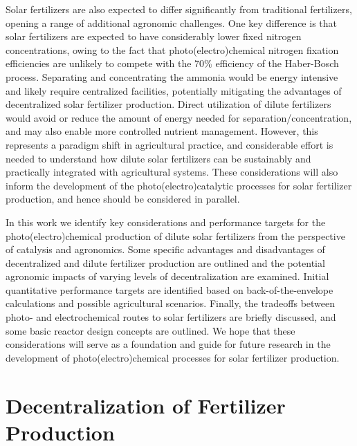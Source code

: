 Solar fertilizers are also expected to differ significantly from traditional fertilizers, opening a range of additional agronomic challenges. One key difference is that solar fertilizers are expected to have considerably lower fixed nitrogen concentrations, owing to the fact that photo(electro)chemical nitrogen fixation efficiencies are unlikely to compete with the 70\% efficiency of the Haber-Bosch process.\cite{Schloegl_2003} %
Separating and concentrating the ammonia would be energy intensive and likely require centralized facilities, potentially mitigating the advantages of decentralized solar fertilizer production. Direct utilization of dilute fertilizers would avoid or reduce the amount of energy needed for separation/concentration, and may also enable more controlled nutrient management. However, this represents a paradigm shift in agricultural practice, and considerable effort is needed to understand how dilute solar fertilizers can be sustainably and practically integrated with agricultural systems. These considerations will also inform the development of the photo(electro)catalytic processes for solar fertilizer production, and hence should be considered in parallel.

In this work we identify key considerations and performance targets for the photo(electro)chemical production of dilute solar fertilizers from the perspective of catalysis and agronomics. Some specific advantages and disadvantages of decentralized and dilute fertilizer production are outlined and the potential agronomic impacts of varying levels of decentralization are examined. Initial quantitative performance targets are identified based on back-of-the-envelope calculations and possible agricultural scenarios. Finally, the tradeoffs between photo- and electrochemical routes to solar fertilizers are briefly discussed, and some basic reactor design concepts are outlined. We hope that these considerations will serve as a foundation and guide for future research in the development of photo(electro)chemical processes for solar fertilizer production.

\section{Decentralization of Fertilizer Production}

